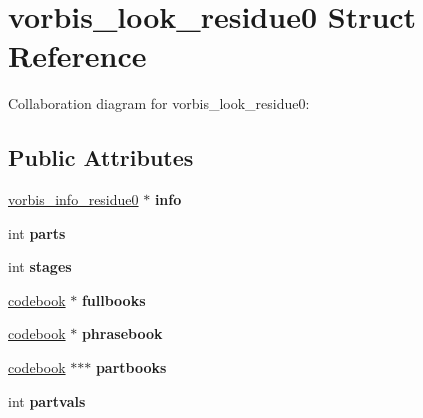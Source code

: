\hypertarget{structvorbis__look__residue0}{\section{vorbis\+\_\+look\+\_\+residue0 Struct Reference}
\label{structvorbis__look__residue0}
}


Collaboration diagram for vorbis\+\_\+look\+\_\+residue0\+:
\subsection*{Public Attributes}
\begin{DoxyCompactItemize}
\item 
\hypertarget{structvorbis__look__residue0_a252d1ad2f196e44467908b5047e0360b}{\hyperlink{structvorbis__info__residue0}{vorbis\+\_\+info\+\_\+residue0} $\ast$ {\bfseries info}}\label{structvorbis__look__residue0_a252d1ad2f196e44467908b5047e0360b}

\item 
\hypertarget{structvorbis__look__residue0_a14945ea26ba740db9c5da5d5e1492677}{int {\bfseries parts}}\label{structvorbis__look__residue0_a14945ea26ba740db9c5da5d5e1492677}

\item 
\hypertarget{structvorbis__look__residue0_a1f6a6208d247971553c5cb4e4b176bd9}{int {\bfseries stages}}\label{structvorbis__look__residue0_a1f6a6208d247971553c5cb4e4b176bd9}

\item 
\hypertarget{structvorbis__look__residue0_a1d93ad3c66a4321afca88cb39586cd5e}{\hyperlink{structcodebook}{codebook} $\ast$ {\bfseries fullbooks}}\label{structvorbis__look__residue0_a1d93ad3c66a4321afca88cb39586cd5e}

\item 
\hypertarget{structvorbis__look__residue0_ad405bb6cfed590491d1d9b54239b1356}{\hyperlink{structcodebook}{codebook} $\ast$ {\bfseries phrasebook}}\label{structvorbis__look__residue0_ad405bb6cfed590491d1d9b54239b1356}

\item 
\hypertarget{structvorbis__look__residue0_a762e98df374be2bdf9ce6992d96871c2}{\hyperlink{structcodebook}{codebook} $\ast$$\ast$$\ast$ {\bfseries partbooks}}\label{structvorbis__look__residue0_a762e98df374be2bdf9ce6992d96871c2}

\item 
\hypertarget{structvorbis__look__residue0_a1f9815f5baffb975d6293b22107d2eaa}{int {\bfseries partvals}}\label{structvorbis__look__residue0_a1f9815f5baffb975d6293b22107d2eaa}


\end{DoxyCompactItemize}
